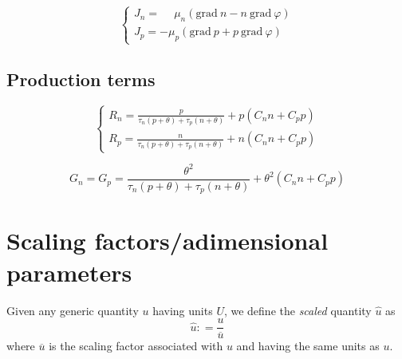 \documentclass[9pt]{amsart}
\begin{document}
\begin{equation}\label{eq:currentsN}
\left\{
\begin{array}{ll}
J_{n} = \phantom{-}\mu_{n} \left( \mathrm{grad}\ n - n\ \mathrm{grad}\ \varphi\right) 
\\[5mm]
J_{p} = -\mu_{p} \left( \mathrm{grad}\ p + p\ \mathrm{grad}\ \varphi\right)  
\end{array}
\right.
\end{equation}

\subsection{Production terms}

\begin{equation}\label{eq:recombinationN}
\left\{
\begin{array}{ll}
R_{n} = \displaystyle \frac{p}{\tau_{n} (p + \theta) + \tau_{p} (n + \theta)}
+ p \left(C_{n} n + C_{p} p \right)
\\[5mm]
R_{p} = \displaystyle \frac{n}{\tau_{n} (p + \theta) + \tau_{p} (n + \theta)}
+ n \left (C_{n} n + C_{p} p \right)
\end{array}
\right.
\end{equation}

\begin{equation}\label{eq:generationN}
G_{n} = G_{p} = 
\displaystyle \frac{\theta^{2}}{\tau_{n} (p + \theta) + \tau_{p} (n + \theta)}
+ \theta^{2} \left(C_{n} n + C_{p} p \right)
\end{equation}

\newpage

\section{Scaling factors/adimensional parameters}

Given any generic quantity $u$ having units $U$, we
define the {\em scaled} quantity $\widehat{u}$ as
$$
\widehat{u} : = \displaystyle \frac{u}{\overline{u}}
$$
where $\overline{u}$ is the scaling factor associated with $u$
and having the same units as $u$. 
\end{document}
